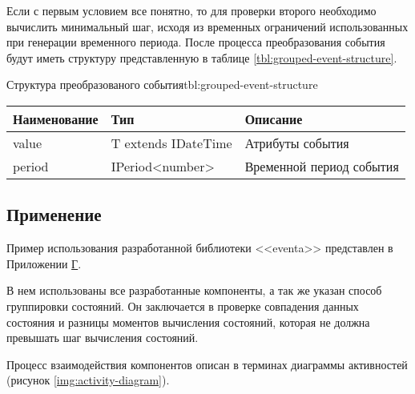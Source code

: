 Если с первым условием все понятно, то для проверки второго необходимо вычислить минимальный шаг, исходя из временных ограничений использованных при генерации временного периода.
После процесса преобразования события будут иметь структуру представленную в таблице \ref{tbl:grouped-event-structure}.

\begin{tblh}{Структура преобразованого события}{tbl:grouped-event-structure}
  \begin{tabularx}{\textwidth}{| p{3cm} | p{4cm} | X |}
    \hline Наименование & Тип                  & Описание                 \\
    \hline value        & T extends IDateTime  & Атрибуты события         \\
    \hline period       & IPeriod<number>      & Временной период события \\
    \hline
    \end{tabularx}
\end{tblh}

\subsection{Применение}

Пример использования разработанной библиотеки <<eventa>> \cite{eventa} представлен в Приложении \hyperlink{app:D}{Г}.

В нем использованы все разработанные компоненты, а так же указан способ группировки состояний.
Он заключается в проверке совпадения данных состояния и разницы моментов вычисления состояний, которая не должна превышать шаг вычисления состояний.

Процесс взаимодействия компонентов описан в терминах диаграммы активностей (рисунок \ref{img:activity-diagram}).

